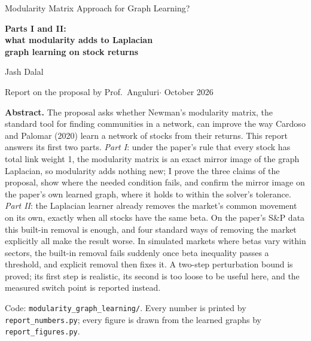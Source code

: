 \documentclass[11pt,a4paper]{article}
\theoremstyle{remark}
\begin{document}
\begin{titlepage}
\centering
\vspace*{2.2cm}
{\Large Modularity Matrix Approach for Graph Learning?\par}
\vspace{6mm}
{\huge\bfseries Parts I and II:\\[2mm] what modularity adds to Laplacian\\[1mm] graph learning on stock returns\par}
\vspace{10mm}
{\large Jash Dalal\par}
\vspace{2mm}
{\normalsize Report on the proposal by Prof.\ Anguluri\quad$\cdot$ October 2026\par}
\vspace{14mm}
\begin{minipage}{0.86\textwidth}
\small
\textbf{Abstract.} The proposal asks whether Newman's modularity matrix, the standard
tool for finding communities in a network, can improve the way Cardoso and Palomar
(2020) learn a network of stocks from their returns. This report answers its first two
parts. \emph{Part I}: under the paper's rule that every stock has total link weight 1,
the modularity matrix is an exact mirror image of the graph Laplacian, so modularity
adds nothing new; I prove the three claims of the proposal, show where the needed
condition fails, and confirm the mirror image on the paper's own learned graph, where it
holds to within the solver's tolerance. \emph{Part II}: the Laplacian learner already
removes the market's common movement on its own, exactly when all stocks have the same
beta. On the paper's S\&P data this built-in removal is enough, and four standard ways
of removing the market explicitly all make the result worse. In simulated markets where
betas vary within sectors, the built-in removal fails suddenly once beta inequality
passes a threshold, and explicit removal then fixes it. A two-step perturbation bound is
proved; its first step is realistic, its second is too loose to be useful here, and the
measured switch point is reported instead.
\end{minipage}
\vfill
{\small Code: \texttt{modularity\_graph\_learning/}. Every number is printed by
\texttt{report\_numbers.py}; every figure is drawn from the learned graphs by
\texttt{report\_figures.py}.\par}
\end{titlepage}
\end{document}
